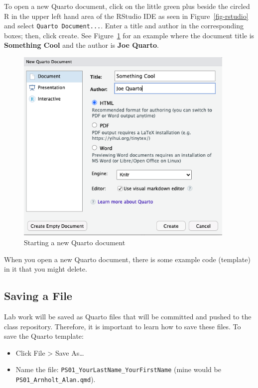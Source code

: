 \documentclass[
  letterpaper,
  DIV=11,
  numbers=noendperiod]{scrartcl}
\providecommand{\tightlist}{%
  \setlength{\itemsep}{0pt}\setlength{\parskip}{0pt}}\usepackage{longtable,booktabs,array}
\begin{document}
To open a new Quarto document, click on the little green plus beside the
circled R in the upper left hand area of the RStudio IDE as seen in
Figure~\ref{fig-rstudio} and select \texttt{Quarto\ Document...}. Enter
a title and author in the corresponding boxes; then, click create. See
Figure~\ref{fig-open} for an example where the document title is
\textbf{Something Cool} and the author is \textbf{Joe Quarto}.

\begin{figure}

{\centering \includegraphics[width=4.15in,height=\textheight]{figures/open-QUARTO.png}

}

\caption{\label{fig-open}Starting a new Quarto document}

\end{figure}

When you open a new Quarto document, there is some example code
(template) in it that you might delete.

\hypertarget{saving-a-file}{%
\subsection{Saving a File}\label{saving-a-file}}

Lab work will be saved as Quarto files that will be committed and pushed
to the class repository. Therefore, it is important to learn how to save
these files. To save the Quarto template:

\begin{itemize}
\tightlist
\item
  Click File \textgreater{} Save As\ldots{}
\item
  Name the file: \texttt{PS01\_YourLastName\_YourFirstName} (mine would
  be \texttt{PS01\_Arnholt\_Alan.qmd}).
\end{itemize}
\end{document}
